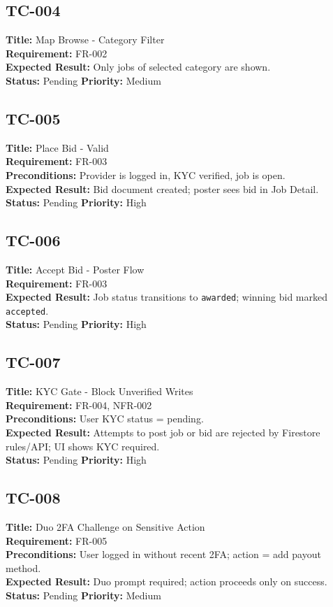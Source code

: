 \documentclass[11pt]{article}
\begin{document}
\subsection*{TC-004}
\textbf{Title:} Map Browse - Category Filter \\
\textbf{Requirement:} FR-002 \\
\textbf{Expected Result:} Only jobs of selected category are shown. \\
\textbf{Status:} Pending \quad \textbf{Priority:} Medium

\subsection*{TC-005}
\textbf{Title:} Place Bid - Valid \\
\textbf{Requirement:} FR-003 \\
\textbf{Preconditions:} Provider is logged in, KYC verified, job is open. \\
\textbf{Expected Result:} Bid document created; poster sees bid in Job Detail. \\
\textbf{Status:} Pending \quad \textbf{Priority:} High

\subsection*{TC-006}
\textbf{Title:} Accept Bid - Poster Flow \\
\textbf{Requirement:} FR-003 \\
\textbf{Expected Result:} Job status transitions to \texttt{awarded}; winning bid marked \texttt{accepted}. \\
\textbf{Status:} Pending \quad \textbf{Priority:} High

\subsection*{TC-007}
\textbf{Title:} KYC Gate - Block Unverified Writes \\
\textbf{Requirement:} FR-004, NFR-002 \\
\textbf{Preconditions:} User KYC status = pending. \\
\textbf{Expected Result:} Attempts to post job or bid are rejected by Firestore rules/API; UI shows KYC required. \\
\textbf{Status:} Pending \quad \textbf{Priority:} High

\subsection*{TC-008}
\textbf{Title:} Duo 2FA Challenge on Sensitive Action \\
\textbf{Requirement:} FR-005 \\
\textbf{Preconditions:} User logged in without recent 2FA; action = add payout method. \\
\textbf{Expected Result:} Duo prompt required; action proceeds only on success. \\
\textbf{Status:} Pending \quad \textbf{Priority:} Medium
\end{document}
